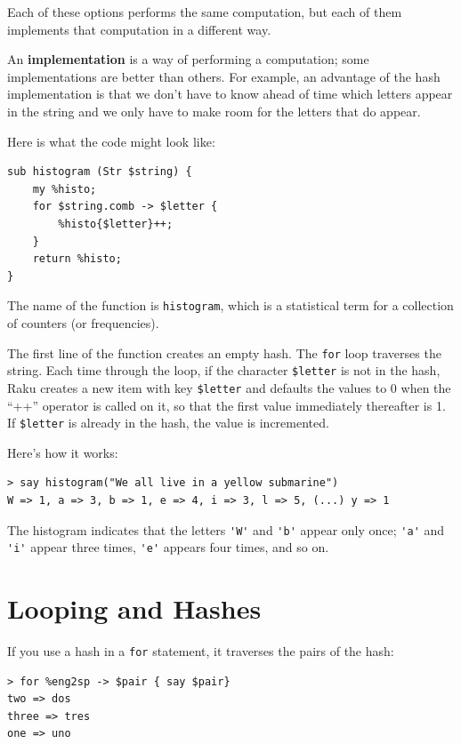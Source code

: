 Each of these options performs the same computation, but each
of them implements that computation in a different way.

An {\bf implementation} is a way of performing a computation;
some implementations are better than others.  For example,
an advantage of the hash implementation is that we don't
have to know ahead of time which letters appear in the string
and we only have to make room for the letters that do appear.

Here is what the code might look like:

\begin{verbatim}
sub histogram (Str $string) {
    my %histo;
    for $string.comb -> $letter {
        %histo{$letter}++;
    }
    return %histo;
}
\end{verbatim}
%
The name of the function is {\tt histogram}, which is a statistical
term for a collection of counters (or frequencies).

The first line of the
function creates an empty hash.  The {\tt for} loop traverses
the string.  Each time through the loop, if the character \verb'$letter' is
not in the hash, Raku creates a new item with key 
\verb'$letter' and defaults the values to 0 when the ``++'' 
operator is called on it, so that the first value immediately 
thereafter is 1.  If \verb'$letter'  is already in the hash,
the value is incremented.

Here's how it works:

\begin{verbatim}
> say histogram("We all live in a yellow submarine")
W => 1, a => 3, b => 1, e => 4, i => 3, l => 5, (...) y => 1
\end{verbatim}
%
The histogram indicates that the letters \verb"'W'" and 
\verb"'b'" appear only once; \verb"'a'" and \verb"'i'" 
appear three times, \verb"'e'" appears four times, and so on.

\section{Looping and Hashes}

If you use a hash in a {\tt for} statement, it traverses
the pairs of the hash:

\begin{verbatim}
> for %eng2sp -> $pair { say $pair}
two => dos
three => tres
one => uno
\end{verbatim}
%

